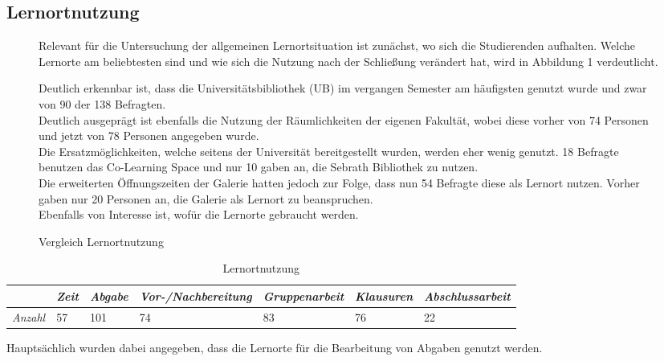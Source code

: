 \documentclass[11pt, a4paper]{article}
\begin{document}
\subsection{Lernortnutzung}
\begin{figure}[h]
Relevant für die Untersuchung der allgemeinen Lernortsituation ist zunächst, wo sich die Studierenden aufhalten. Welche Lernorte am beliebtesten sind und wie sich die Nutzung nach der Schließung verändert hat, wird in Abbildung 1 verdeutlicht.

 
	\caption{Vergleich Lernortnutzung}
\leavevmode

Deutlich erkennbar ist, dass die Universitätsbibliothek (UB) im vergangen Semester am häufigsten genutzt wurde und zwar von 90 der 138 Befragten.\\
Deutlich ausgeprägt ist ebenfalls die Nutzung der Räumlichkeiten der eigenen Fakultät, wobei diese vorher von 74 Personen und jetzt von 78 Personen angegeben wurde. \\
Die Ersatzmöglichkeiten, welche seitens der Universität bereitgestellt wurden, werden eher wenig genutzt. 18 Befragte benutzen das Co-Learning Space und nur 10 gaben an, die Sebrath Bibliothek zu nutzen.\\
Die erweiterten Öffnungszeiten der Galerie hatten jedoch zur Folge, dass nun 54 Befragte diese als Lernort nutzen. Vorher gaben nur 20 Personen an, die Galerie als Lernort zu beanspruchen.\\


Ebenfalls von Interesse ist, wofür die Lernorte gebraucht werden.
\end{figure}
\begin{table}[h]
	\begin{tabular}{l|llllll}
		& \textit{Zeit} & \textit{Abgabe} & \textit{Vor-/Nachbereitung} & \textit{Gruppenarbeit} & \textit{Klausuren} & \textit{Abschlussarbeit} \\ \hline
		\textit{Anzahl} & 57            & 101             & 74                          & 83                     & 76                 & 22                      
	\end{tabular}
		\caption{Lernortnutzung}
\end{table}

Hauptsächlich wurden dabei angegeben, dass die Lernorte für die Bearbeitung von Abgaben genutzt werden. 
\leavevmode
\end{document}
